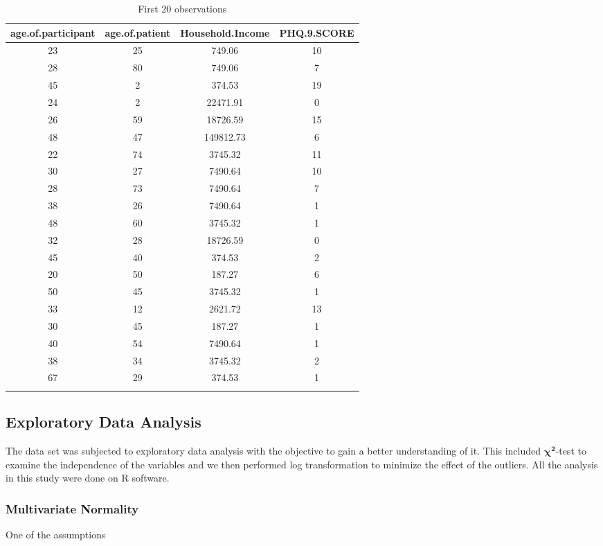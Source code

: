 \documentclass{article}
\numberwithin{equation}{section}
\begin{document}
\begin{longtable}[t]{|c|c|c|c|}
	\hline
	age.of.participant & age.of.patient & Household.Income & PHQ.9.SCORE\\
	\hline
	23 & 25 & 749.06 & 10\\
	28 & 80 & 749.06 & 7\\
	45 & 2 & 374.53 & 19\\
	24 & 2 & 22471.91 & 0\\
	26 & 59 & 18726.59 & 15\\
	
	48 & 47 & 149812.73 & 6\\
	22 & 74 & 3745.32 & 11\\
	30 & 27 & 7490.64 & 10\\
	28 & 73 & 7490.64 & 7\\
	38 & 26 & 7490.64 & 1\\
	
	48 & 60 & 3745.32 & 1\\
	32 & 28 & 18726.59 & 0\\
	45 & 40 & 374.53 & 2\\
	20 & 50 & 187.27 & 6\\
	50 & 45 & 3745.32 & 1\\
	
	33 & 12 & 2621.72 & 13\\
	30 & 45 & 187.27 & 1\\
	40 & 54 & 7490.64 & 1\\
	38 & 34 & 3745.32 & 2\\
	67 & 29 & 374.53 & 1\\
	\hline
	
	\caption{\label{tab:table 1}First 20 observations}
\end{longtable}

\subsection{Exploratory Data Analysis}
The data set was subjected to exploratory data analysis with the objective to gain a better understanding of it. This included $\boldsymbol{\chi^2}$-test to examine the independence of the variables and we then performed log transformation to minimize the effect of the outliers. All the analysis in this study were done on R software.

\subsubsection{Multivariate Normality}

One of the assumptions 

	
\end{document}
